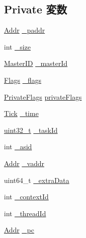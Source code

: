 \subsection*{Private 変数}
\begin{DoxyCompactItemize}
\item 
\hyperlink{base_2types_8hh_af1bb03d6a4ee096394a6749f0a169232}{Addr} \hyperlink{classRequest_af988966e1853653146cc5161488cdd6a}{\_\-paddr}
\item 
int \hyperlink{classRequest_aaa6c8c862a2c0bc18c802314cc58961d}{\_\-size}
\item 
\hyperlink{request_8hh_ac366b729262fd8e7cbd3283da6f775cf}{MasterID} \hyperlink{classRequest_a23e4e74239f2919fd2f05d672fbf7cb7}{\_\-masterId}
\item 
\hyperlink{classFlags}{Flags} \hyperlink{classRequest_af06d77fa987a3b16cc23de9ac834c43d}{\_\-flags}
\item 
\hyperlink{classFlags}{PrivateFlags} \hyperlink{classRequest_ac782f50d7181bf00501f6aeffe814aae}{privateFlags}
\item 
\hyperlink{base_2types_8hh_a5c8ed81b7d238c9083e1037ba6d61643}{Tick} \hyperlink{classRequest_a848722ed50c2d59ce4204882e4ea21b6}{\_\-time}
\item 
\hyperlink{Type_8hh_a435d1572bf3f880d55459d9805097f62}{uint32\_\-t} \hyperlink{classRequest_a26b7e95ff0ac1179f5e53088c59a24bb}{\_\-taskId}
\item 
int \hyperlink{classRequest_ac24687367088700482ebb107b36c2c17}{\_\-asid}
\item 
\hyperlink{base_2types_8hh_af1bb03d6a4ee096394a6749f0a169232}{Addr} \hyperlink{classRequest_a7a230e408dae69495842b5941bb795b1}{\_\-vaddr}
\item 
uint64\_\-t \hyperlink{classRequest_a51db05d8e83877867535a177e3b80fdd}{\_\-extraData}
\item 
int \hyperlink{classRequest_a4fea6f718ae601dc81fce73e88774682}{\_\-contextId}
\item 
int \hyperlink{classRequest_a4b170276468a329fe4b63ca0ebcb390d}{\_\-threadId}
\item 
\hyperlink{base_2types_8hh_af1bb03d6a4ee096394a6749f0a169232}{Addr} \hyperlink{classRequest_aca8c2d126b6fd936bb5c48007248beed}{\_\-pc}
\end{DoxyCompactItemize}

